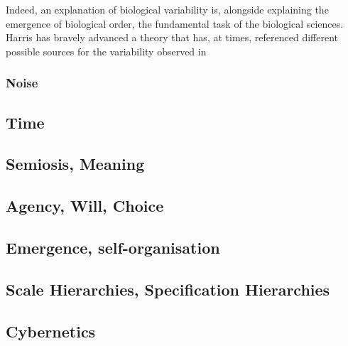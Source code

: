 Indeed, an explanation of biological variability is, alongside explaining the emergence of biological order, the fundamental task of the biological sciences. Harris has bravely advanced a theory that has, at times, referenced different possible sources for the variability observed in 

\subsubsection{Noise}

\subsection{Time}
\label{time}
\subsection{Semiosis, Meaning}
\label{semiosis}
\subsection{Agency, Will, Choice}
\label{agency}
\subsection{Emergence, self-organisation}
\label{emergence}
\subsection{Scale Hierarchies, Specification Hierarchies}
\label{hierarchy}
\subsection{Cybernetics}
\label{cybernetics}
